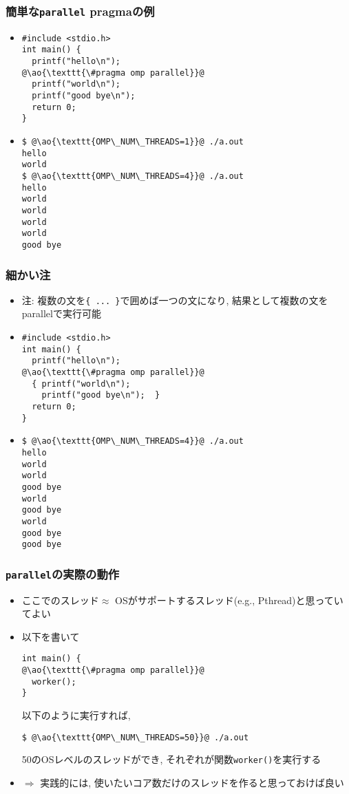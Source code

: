 \documentclass[10pt,dvipdfmx]{beamer}
\newcommand{\ao}[1]{{\color{blue}#1}}
\begin{document}
\begin{frame}[fragile]
\frametitle{簡単な{\tt parallel} pragmaの例}

\begin{itemize}
\item []
\begin{lstlisting}
#include <stdio.h>
int main() {
  printf("hello\n");
@\ao{\texttt{\#pragma omp parallel}}@
  printf("world\n");
  printf("good bye\n");
  return 0;
}
\end{lstlisting}

\item []
\begin{lstlisting}
$ @\ao{\texttt{OMP\_NUM\_THREADS=1}}@ ./a.out
hello
world
$ @\ao{\texttt{OMP\_NUM\_THREADS=4}}@ ./a.out
hello
world
world
world
world
good bye
\end{lstlisting}
\end{itemize}
\end{frame}

\begin{frame}[fragile]
\frametitle{細かい注}

\begin{itemize}
\item 注: 複数の文を\texttt{\{ ... \}}で囲めば一つの文になり,
  結果として複数の文をparallelで実行可能
\item []
\begin{lstlisting}
#include <stdio.h>
int main() {
  printf("hello\n");
@\ao{\texttt{\#pragma omp parallel}}@
  { printf("world\n");
    printf("good bye\n");  }
  return 0;
}
\end{lstlisting}

\item []
\begin{lstlisting}
$ @\ao{\texttt{OMP\_NUM\_THREADS=4}}@ ./a.out
hello
world
world
good bye
world
good bye
world
good bye
good bye
\end{lstlisting} %
\end{itemize}
\end{frame}

\begin{frame}[fragile]
\frametitle{\texttt{parallel}の実際の動作}
\begin{itemize}
\item ここでのスレッド$\approx$ OSがサポートするスレッド(e.g., Pthread)と思っていてよい

\item 以下を書いて
\begin{lstlisting}
int main() {
@\ao{\texttt{\#pragma omp parallel}}@
  worker();
}
\end{lstlisting}
以下のように実行すれば, 
\begin{lstlisting}
$ @\ao{\texttt{OMP\_NUM\_THREADS=50}}@ ./a.out
\end{lstlisting} %
50のOSレベルのスレッドができ, それぞれが関数{\tt worker()}を実行する

\item $\Rightarrow$ 実践的には,
  \ao{使いたいコア数}だけのスレッドを作ると思っておけば良い
\end{itemize}
\end{frame}
\end{document}
